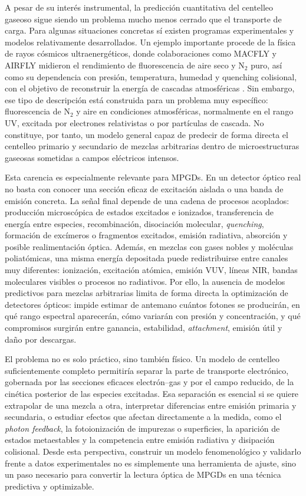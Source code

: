 \documentclass[12pt,a4paper]{article}
\begin{document}
A pesar de su interés instrumental, la predicción cuantitativa del centelleo gaseoso sigue siendo un problema mucho menos cerrado que el transporte de carga. Para algunas situaciones concretas sí existen programas experimentales y modelos relativamente desarrollados. Un ejemplo importante procede de la física de rayos cósmicos ultraenergéticos, donde colaboraciones como MACFLY y AIRFLY midieron el rendimiento de fluorescencia de aire seco y N$_2$ puro, así como su dependencia con presión, temperatura, humedad y quenching colisional, con el objetivo de reconstruir la energía de cascadas atmosféricas \cite{colin2007macfly,ave2008airfly}. Sin embargo, ese tipo de descripción está construida para un problema muy específico: fluorescencia de N$_2$ y aire en condiciones atmosféricas, normalmente en el rango UV, excitada por electrones relativistas o por partículas de cascada. No constituye, por tanto, un modelo general capaz de predecir de forma directa el centelleo primario y secundario de mezclas arbitrarias dentro de microestructuras gaseosas sometidas a campos eléctricos intensos.

Esta carencia es especialmente relevante para MPGDs. En un detector óptico real no basta con conocer una sección eficaz de excitación aislada o una banda de emisión concreta. La señal final depende de una cadena de procesos acoplados: producción microscópica de estados excitados e ionizados, transferencia de energía entre especies, recombinación, disociación molecular, \emph{quenching}, formación de excímeros o fragmentos excitados, emisión radiativa, absorción y posible realimentación óptica. Además, en mezclas con gases nobles y moléculas poliatómicas, una misma energía depositada puede redistribuirse entre canales muy diferentes: ionización, excitación atómica, emisión VUV, líneas NIR, bandas moleculares visibles o procesos no radiativos. Por ello, la ausencia de modelos predictivos para mezclas arbitrarias limita de forma directa la optimización de detectores ópticos: impide estimar de antemano cuántos fotones se producirán, en qué rango espectral aparecerán, cómo variarán con presión y concentración, y qué compromisos surgirán entre ganancia, estabilidad, \emph{attachment}, emisión útil y daño por descargas.

El problema no es solo práctico, sino también físico. Un modelo de centelleo suficientemente completo permitiría separar la parte de transporte electrónico, gobernada por las secciones eficaces electrón--gas y por el campo reducido, de la cinética posterior de las especies excitadas. Esa separación es esencial si se quiere extrapolar de una mezcla a otra, interpretar diferencias entre emisión primaria y secundaria, o estudiar efectos que afectan directamente a la medida, como el \emph{photon feedback}, la fotoionización de impurezas o superficies, la aparición de estados metaestables y la competencia entre emisión radiativa y disipación colisional. Desde esta perspectiva, construir un modelo fenomenológico y validarlo frente a datos experimentales no es simplemente una herramienta de ajuste, sino un paso necesario para convertir la lectura óptica de MPGDs en una técnica predictiva y optimizable.
\end{document}
